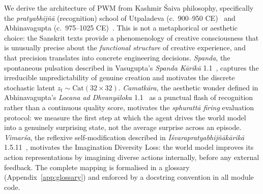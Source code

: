 \documentclass[journal,onecolumn,11pt]{IEEEtran}
\begin{document}
We derive the architecture of PWM from Kashmir Śaiva philosophy, specifically
the \emph{pratyabhijñā} (recognition) school of
Utpaladeva (c.\ 900--950 CE)~\cite{utpaladeva1994isvara,torella1994isvara}
and Abhinavagupta (c.\ 975--1025 CE)~\cite{abhinavagupta2012tantraloka,abhinava1992locana}.
This is not a metaphorical or aesthetic choice: the Sanskrit texts provide a
phenomenology of creative consciousness that is unusually precise about the
\emph{functional structure} of creative experience, and that precision
translates into concrete engineering decisions.
\emph{Spanda}, the spontaneous pulsation described in Vasugupta's
\emph{Spanda Kārikā} 1.1~\cite{vasugupta1992spanda,dyczkowski1992spanda},
captures the irreducible unpredictability of genuine creation and motivates
the discrete stochastic latent $z_t \sim \text{Cat}(32{\times}32)$.
\emph{Camatkāra}, the aesthetic wonder defined in Abhinavagupta's
\emph{Locana ad Dhvanyāloka} 1.1~\cite{abhinava1992locana} as a punctual
flash of recognition rather than a continuous quality score, motivates the
\emph{sphurattā firing} evaluation protocol: we measure the first step at
which the agent drives the world model into a genuinely surprising state,
not the average surprise across an episode.
\emph{Vimarśa}, the reflexive self-modification described in
\emph{Īśvarapratyabhijñākārikā} 1.5.11~\cite{utpaladeva1994isvara,torella1994isvara},
motivates the Imagination Diversity Loss: the world model improves its
action representations by imagining diverse actions internally, before any
external feedback.
The complete mapping is formalised in a glossary
(Appendix~\ref{app:glossary}) and enforced by a docstring convention in all
module code.
\end{document}
